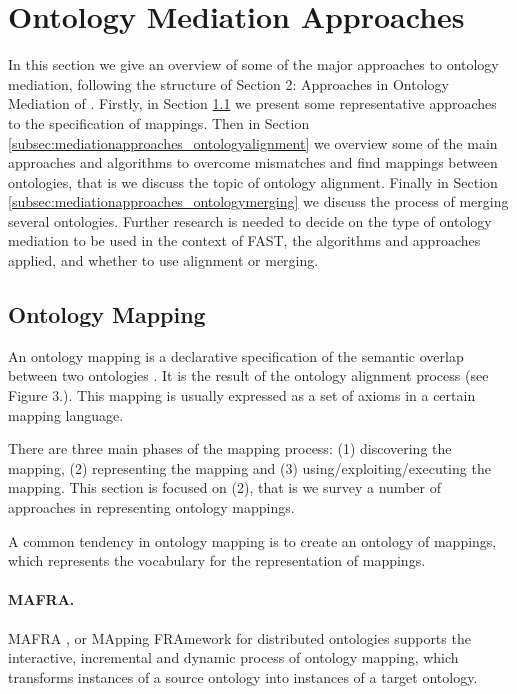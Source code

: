 \section{Ontology Mediation Approaches}
\label{sec:mediationapproaches}
In this section we give an overview of some of the major approaches to
ontology mediation, following the structure of Section 2: Approaches in
Ontology Mediation of \cite{debruin2005wsml}. Firstly, in Section
\ref{subsec:mediationapproaches_ontologymapping} we present some representative approaches to the specification of
mappings. Then in Section \ref{subsec:mediationapproaches_ontologyalignment} we overview some of the main approaches
and algorithms to overcome mismatches and find mappings between
ontologies, that is we discuss the topic of ontology alignment. Finally
in Section \ref{subsec:mediationapproaches_ontologymerging} we discuss the process of merging several ontologies.
Further research is needed to decide on the type of ontology mediation
to be used in the context of FAST, the algorithms and approaches
applied, and whether to use alignment or merging. 

\subsection{Ontology Mapping}
\label{subsec:mediationapproaches_ontologymapping}
An ontology mapping is a declarative specification of the semantic
overlap between two ontologies \cite{debruin2005wsml}. It is the
result of the ontology alignment process (see Figure 3.). This mapping
is usually expressed as a set of axioms in a certain mapping language. 

There are three main phases of the mapping process: (1) discovering the
mapping, (2) representing the mapping and (3)
using/exploiting/executing the mapping. This section is focused on (2),
that is we survey a number of approaches in representing ontology
mappings. 

A common tendency in ontology mapping is to create an ontology of
mappings, which represents the vocabulary for the representation of
mappings. 

\paragraph{MAFRA.}
MAFRA \cite{maedche2002mafra}, or MApping FRAmework for distributed
ontologies supports the interactive, incremental and dynamic process of
ontology mapping, which transforms instances of a source ontology into
instances of a target ontology. 

